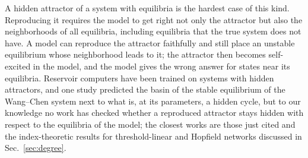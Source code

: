 A hidden attractor of a system with equilibria is the hardest case of this kind. Reproducing it requires the model to get
right not only the attractor but also the neighborhoods of all equilibria, including equilibria that the true system does
not have. A model can reproduce the attractor faithfully and still place an unstable equilibrium whose neighborhood leads to
it; the attractor then becomes self-excited in the model, and the model gives the wrong answer for states near its
equilibria. Reservoir computers have been trained on systems with hidden attractors,\cite{Xu2024SelfESN,Mahata2025Extreme}
and one study predicted the basin of the stable equilibrium of the Wang--Chen system next to what is, at its parameters, a
hidden cycle,\cite{Liu2025HiddenDynamics} but to our knowledge no work has checked whether a reproduced attractor stays
hidden with respect to the equilibria of the model; the closest works are those just cited and the index-theoretic
results for threshold-linear and Hopfield networks discussed in Sec.~\ref{sec:degree}.

